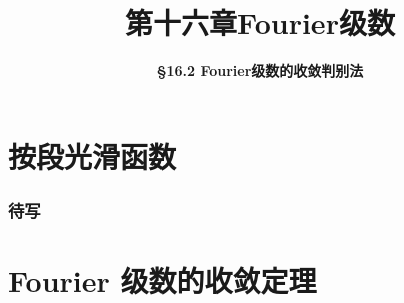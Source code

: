 \everymath{\displaystyle}



\title[第十六章\\
Fourier级数]{\texorpdfstring{\LARGE \bfseries 第十六章\quad Fourier级数}{第十六章 Fourier级数}} %
\author[\smaller \S 16.2\\
收敛判别法] %
{\Large \bfseries \S 16.2 Fourier级数的收敛判别法}
\date{}





\begin{frame}

\titlepage %

\end{frame}



\section{按段光滑函数}


\begin{frame}
\frametitle{待写}

\end{frame}


\section{Fourier 级数的收敛定理}


